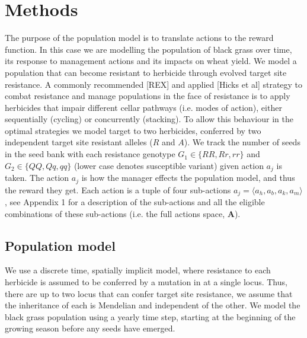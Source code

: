 \documentclass[12pt, a4paper]{article}
\begin{document}
\section*{Methods}
The purpose of the population model is to translate actions to the reward function. In this case we are modelling the population of black grass over time, its response to management actions and its impacts on wheat yield. We model a population that can become resistant to herbicide through evolved target site resistance. A commonly recommended [REX] and applied [Hicks et al] strategy to combat resistance and manage populations in the face of resistance is to apply herbicides that impair different cellar pathways (i.e. modes of action), either sequentially (cycling) or concurrently (stacking). To allow this behaviour in the optimal strategies we model target to two herbicides, conferred by two independent target site resistant alleles ($R$ and $A$). We track the number of seeds in the seed bank with each resistance genotype $G_1 \in \{RR, Rr, rr\}$ and $G_2 \in \{QQ, Qq, qq\}$ (lower case denotes susceptible variant) given action $a_j$ is taken. The action $a_j$ is how the manager effects the population model, and thus the reward they get. Each action is a tuple of four sub-actions $a_j = \langle a_h, a_b, a_k, a_m \rangle$, see Appendix 1 for a description of the sub-actions and all the eligible combinations of these sub-actions (i.e. the full actions space, $\mathbf{A}$).   

\subsection*{Population model}
We use a discrete time, spatially implicit model, where resistance to each herbicide is assumed to be conferred by a mutation in at a single locus. Thus, there are up to two locus that can confer target site resistance, we assume that the inheritance of each is Mendelian and independent of the other. We model the black grass population using a yearly time step, starting at the beginning of the growing season before any seeds have emerged.
\end{document}
